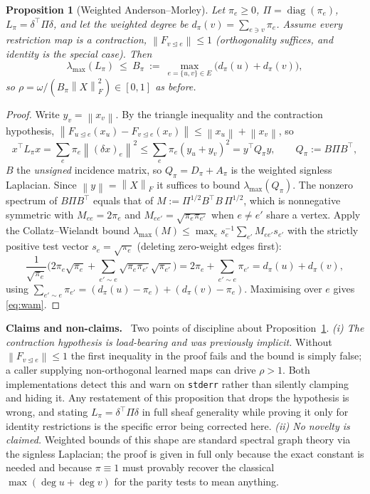 \documentclass[11pt]{article}
\theoremstyle{definition}
\theoremstyle{plain}
\newtheorem{proposition}[definition]{Proposition}
\theoremstyle{remark}
\newcommand{\Hon}{\noindent\textbf{\color{honestycol}Claims and non-claims.}\ }
\newcommand{\rest}[1]{F_{#1}}
\newcommand{\diag}{\operatorname{diag}}
\newcommand{\norm}[1]{\left\lVert #1 \right\rVert}
\newcommand{\triang}{\trianglelefteq}
\begin{document}
\begin{proposition}[Weighted Anderson--Morley]\label{prop:wam}
Let $\pi_e\ge0$, $\Pi=\diag(\pi_e)$, $L_\pi=\delta^\top\Pi\delta$, and let the
\emph{weighted degree} be $d_\pi(v)=\sum_{e\ni v}\pi_e$. Assume every restriction map
is a contraction, $\norm{\rest{v\triang e}}\le1$ (orthogonality suffices, and identity
is the special case). Then
\begin{equation}\label{eq:wam}
\lambda_{\max}(L_\pi)\ \le\ B_\pi\ :=\ \max_{e=\{u,v\}\in E}\big(d_\pi(u)+d_\pi(v)\big),
\end{equation}
so $\rho=\omega/(B_\pi\norm{X}_F^2)\in[0,1]$ as before.
\end{proposition}
\begin{proof}
Write $y_v=\norm{x_v}$. By the triangle inequality and the contraction hypothesis,
$\norm{\rest{u\triang e}(x_u)-\rest{v\triang e}(x_v)}\le\norm{x_u}+\norm{x_v}$, so
\[
x^\top L_\pi x=\sum_e\pi_e\norm{(\delta x)_e}^2\le\sum_e\pi_e(y_u+y_v)^2=y^\top Q_\pi y,
\qquad Q_\pi:=B\Pi B^\top,
\]
$B$ the \emph{unsigned} incidence matrix, so $Q_\pi=D_\pi+A_\pi$ is the weighted
signless Laplacian. Since $\norm{y}=\norm{X}_F$ it suffices to bound
$\lambda_{\max}(Q_\pi)$. The nonzero spectrum of $B\Pi B^\top$ equals that of
$M:=\Pi^{1/2}B^\top B\,\Pi^{1/2}$, which is nonnegative symmetric with $M_{ee}=2\pi_e$
and $M_{ee'}=\sqrt{\pi_e\pi_{e'}}$ when $e\neq e'$ share a vertex. Apply the
Collatz--Wielandt bound $\lambda_{\max}(M)\le\max_e s_e^{-1}\sum_{e'}M_{ee'}s_{e'}$
with the strictly positive test vector $s_e=\sqrt{\pi_e}$ (deleting zero-weight edges
first):
\[
\frac1{\sqrt{\pi_e}}\Big(2\pi_e\sqrt{\pi_e}+\sum_{e'\sim e}\sqrt{\pi_e\pi_{e'}}\sqrt{\pi_{e'}}\Big)
=2\pi_e+\sum_{e'\sim e}\pi_{e'}=d_\pi(u)+d_\pi(v),
\]
using $\sum_{e'\sim e}\pi_{e'}=(d_\pi(u)-\pi_e)+(d_\pi(v)-\pi_e)$. Maximising over $e$
gives \eqref{eq:wam}.
\end{proof}

\begin{hon}\Hon
Two points of discipline about Proposition~\ref{prop:wam}.
\emph{(i) The contraction hypothesis is load-bearing and was previously implicit.}
Without $\norm{\rest{v\triang e}}\le1$ the first inequality in the proof fails and the
bound is simply false; a caller supplying non-orthogonal learned maps can drive
$\rho>1$. Both implementations detect this and warn on \texttt{stderr} rather than
silently clamping and hiding it. Any restatement of this proposition that drops the
hypothesis is wrong, and stating $L_\pi=\delta^\top\Pi\delta$ in full sheaf generality
while proving it only for identity restrictions is the specific error being corrected
here.
\emph{(ii) No novelty is claimed.} Weighted bounds of this shape are standard spectral
graph theory via the signless Laplacian; the proof is given in full only because the
exact constant is needed and because $\pi\equiv1$ must provably recover the classical
$\max(\deg u+\deg v)$ for the parity tests to mean anything.
\end{hon}
\end{document}

